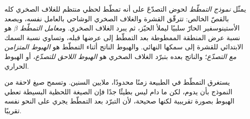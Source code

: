 \begin{definition}\label{def:b2:basins-compared:stretching}
يمثّل \emph{نموذج التمطّط} لحوض التصدّعَ على أنه
تمطّط لحظي منتظم للغلاف الصخري كله بالقصّ الخالص: تترقّق القشرة والغلاف الصخري
الوشاحي بالعامل نفسه، ويصعد الأستينوسفير الحارّ سلبيًا ليملأ
الحيّز، ثم يبرد الغلاف الصخري. و\emph{معامل التمطّط}
$\beta$ هو نسبة عرض المنطقة الممطوطة بعد التمطّط إلى عرضها قبله،
وتساوي نسبة السمك الابتدائي للقشرة إلى سمكها النهائي. والهبوط الناتج
أثناء التمطّط هو \emph{الهبوط المتزامن مع التصدّع}؛ والناتج
بعده بتبرّد الغلاف الصخري هو \emph{الهبوط اللاحق
للتصدّع}، أو الهبوط الحراري.
\end{definition}

يستغرق التمطّط في الطبيعة زمنًا محدودًا، ملايين السنين. وتسمح صيغ لاحقة من النموذج بأن
يدوم، لكن ما دام ليس بطيئًا جدًا فإن الصيغة اللحظية البسيطة تعطي الهبوط
بصورة تقريبية لكنها صحيحة، لأن التبرّد بعد التمطّط يجري على النحو نفسه تقريبًا.

